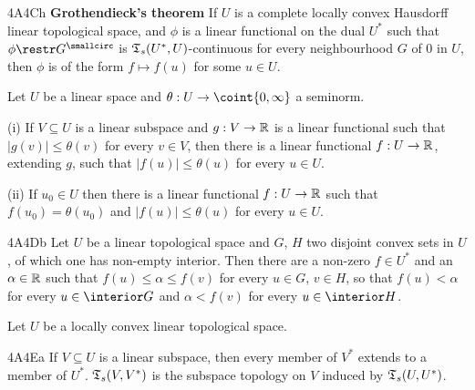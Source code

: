 \spheader 4A4Ch {\bf Grothendieck's theorem} If $U$ is a complete
locally convex Hausdorff linear topological space, and $\phi$ is a
linear functional on the dual $U^*$ such that
$\phi\restr G^{\smallcirc}$ is
$\frak T_s(U^*,U)$-continuous for every neighbourhood $G$ of $0$ in
$U$, then $\phi$ is of
the form $f\mapsto f(u)$ for some $u\in U$.


 Let $U$ be a linear space and
$\theta:U\to\coint{0,\infty}$ a seminorm.

\quad(i) If $V\subseteq U$ is a
linear subspace and $g:V\to\Bbb R$ is a linear functional such that
$|g(v)|\le\theta(v)$ for every $v\in V$, then there is a linear
functional $f:U\to\Bbb R$, extending $g$, such that $|f(u)|\le\theta(u)$
for every $u\in U$.

\quad(ii) If $u_0\in U$ then there is
a linear functional $f:U\to\Bbb R$ such that $f(u_0)=\theta(u_0)$ and
$|f(u)|\le\theta(u)$ for every $u\in U$.

\spheader 4A4Db Let $U$ be a linear topological space and $G$, $H$ two
disjoint convex sets in $U$, of which one has non-empty interior.   Then
there are a non-zero $f\in U^*$ and an
$\alpha\in\Bbb R$ such that $f(u)\le\alpha\le f(v)$ for every $u\in G$,
$v\in H$, so that $f(u)<\alpha$ for every $u\in\interior G$ and
$\alpha<f(v)$ for every $u\in\interior H$.

 Let $U$
be a locally convex linear topological space.

\spheader 4A4Ea If $V\subseteq U$ is a linear subspace, then every
member of $V^*$ extends to a member of $U^*$.
$\frak T_s(V,V^*)$ is the subspace
topology on $V$ induced by $\frak T_s(U,U^*)$.  \prooflet{}

